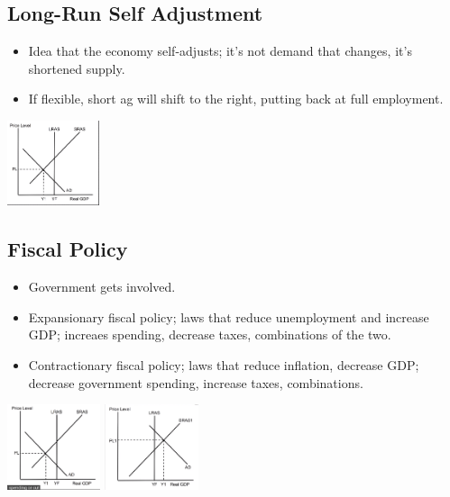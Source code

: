 \documentclass[8pt]{beamer}
\begin{document}
  \begin{frame}
	\section{Long-Run Self Adjustment}
	\begin{itemize}
		\item Idea that the economy self-adjusts; it's not demand that changes, it's shortened supply.
		\item If flexible, short ag will shift to the right, putting back at full employment.
	\end{itemize}
	\includegraphics[height=2.5cm]{2021-10-12-12-49-20.png}
  \end{frame}
  \begin{frame}
	\section{Fiscal Policy}
	\begin{itemize}
		\item Government gets involved.
		\item Expansionary fiscal policy; laws that reduce unemployment and
		increase GDP; increaes spending, decrease taxes, combinations of the two.
		\item Contractionary fiscal policy; laws that reduce inflation, decrease GDP;
		decrease government spending, increase taxes, combinations.
	\end{itemize}
	\includegraphics[height=2.5cm]{2021-10-12-12-51-33.png}
	\includegraphics[height=2.5cm]{2021-10-12-12-51-48.png}
  \end{frame}
\end{document}
